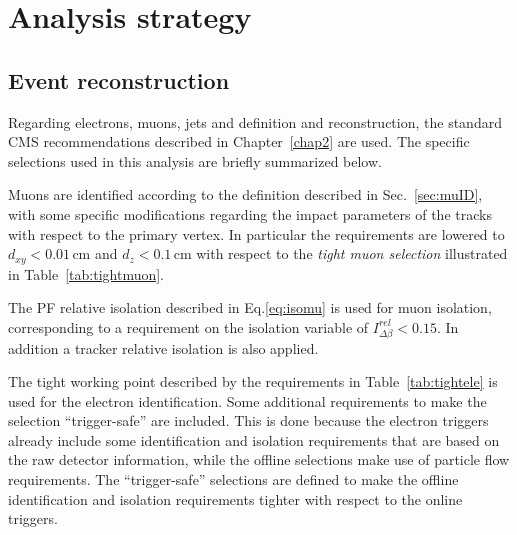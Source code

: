 \section{Analysis strategy}\label{chap5:analysis_strategy}

\subsection{Event reconstruction}

Regarding electrons, muons, jets and \MET definition and reconstruction, the standard CMS recommendations described in Chapter~\ref{chap2} are used. The specific selections used in this analysis are briefly summarized below.

Muons are identified according to the definition described in Sec.~\ref{sec:muID}, with some specific modifications regarding the impact parameters of the tracks with respect to the primary vertex. In particular the requirements are lowered to $d_{xy}<0.01$\,cm and $d_z < 0.1$\,cm with respect to the \emph{tight muon selection} illustrated in Table~\ref{tab:tightmuon}.


The PF relative isolation described in Eq.\eqref{eq:isomu} is used for muon isolation, corresponding to a requirement on the isolation variable of $I^{rel}_{\Delta\beta} < 0.15$. In addition a tracker relative isolation is also applied.

The tight working point described by the requirements in Table~\ref{tab:tightele} is used for the electron identification. Some additional requirements to make the selection ``trigger-safe'' are included. This is done because the electron triggers already include some identification and isolation requirements that are based on the raw detector information, while the offline selections make use of particle flow requirements. The ``trigger-safe'' selections are defined to make the offline identification and isolation requirements tighter with respect to the online triggers.

